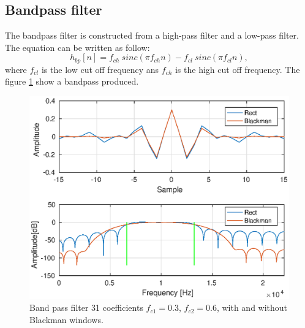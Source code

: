 \documentclass[twoside,twocolumn]{article}
\begin{document}
\subsection{Bandpass filter}
The bandpass filter is constructed from a high-pass filter and a low-pass filter. The equation can be written as follow:
\begin{equation}
	h_{bp}[n]= f_{ch}\  sinc(\pi f_{ch}n) - f_{cl}\  sinc(\pi f_{cl}n), 
\end{equation}
where $f_{cl}$ is the low cut off frequency ans $f_{ch} $ is the high cut off frequency. The figure \ref{bandpass} show a bandpass produced.
\begin{figure}[h!]
	\centering
	\includegraphics[scale=0.5]{./images/bandpass.eps}
	\caption{Band pass filter 31 coefficients $f_{c1}=0.3$, $f_{c2}=0.6$, with and without Blackman windows.}
	\label{bandpass}
\end{figure}
\end{document}
